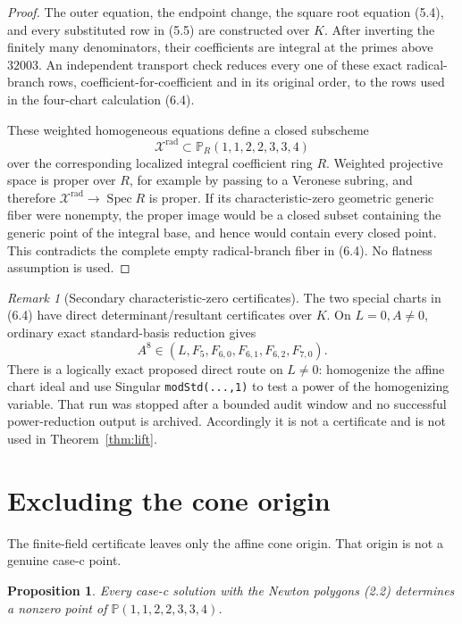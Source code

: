 \documentclass[11pt]{article}
\newtheorem{proposition}[theorem]{Proposition}
\theoremstyle{definition}
\theoremstyle{remark}
\newtheorem{remark}[theorem]{Remark}
\newcommand{\PP}{\mathbb P}
\begin{document}
\begin{proof}
The outer equation, the endpoint change, the square root equation (5.4),
and every substituted row in (5.5) are constructed over \(K\).  After
inverting the finitely many denominators, their coefficients are integral
at the primes above \(32003\).  An independent transport check reduces
every one of these exact radical-branch rows,
coefficient-for-coefficient and in its original order, to the rows used
in the four-chart calculation (6.4).

These weighted homogeneous equations define a closed subscheme
\[
 \mathcal X^{\mathrm{rad}}\subset\PP_R(1,1,2,2,3,3,4)
\]
over the corresponding localized integral coefficient ring \(R\).
Weighted projective space is proper over \(R\), for example by passing to
a Veronese subring, and therefore
\(\mathcal X^{\mathrm{rad}}\to\operatorname{Spec}R\) is proper.  If its
characteristic-zero geometric generic fiber were nonempty, the proper
image would be a closed subset containing the generic point of the
integral base, and hence would contain every closed point.  This
contradicts the complete empty radical-branch fiber in (6.4).  No
flatness assumption is used.
\end{proof}

\begin{remark}[Secondary characteristic-zero certificates]
The two special charts in (6.4) have direct determinant/resultant
certificates over \(K\).  On \(L=0,A\ne0\), ordinary exact standard-basis
reduction gives
\[
 A^8\in
 (L,F_5,F_{6,0},F_{6,1},F_{6,2},F_{7,0}).
\]
There is a logically exact proposed direct route on \(L\ne0\): homogenize
the affine chart ideal and use Singular \texttt{modStd(...,1)} to test a
power of the homogenizing variable.  That run was stopped after a bounded
audit window and no successful power-reduction output is archived.
Accordingly it is not a certificate and is not used in
Theorem~\ref{thm:lift}.
\end{remark}

\section{Excluding the cone origin}\label{sec:origin}

The finite-field certificate leaves only the affine cone origin.  That
origin is not a genuine case-c point.

\begin{proposition}\label{prop:origin}
Every case-c solution with the Newton polygons (2.2) determines a
nonzero point of
\(\PP(1,1,2,2,3,3,4)\).
\end{proposition}
\end{document}
